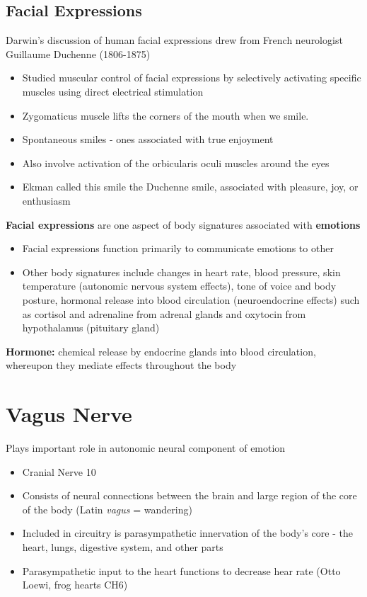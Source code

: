 \documentclass{article}
\begin{document}
\subsection{Facial Expressions}
Darwin's discussion of human facial expressions drew from French neurologist Guillaume Duchenne (1806-1875)
\begin{itemize}
    \item Studied muscular control of facial expressions by selectively activating specific muscles using direct electrical stimulation
    \item Zygomaticus muscle lifts the corners of the mouth when we smile. 
    \item Spontaneous smiles - ones associated with true enjoyment
    \item Also involve activation of the orbicularis oculi muscles around the eyes
    \item Ekman called this smile the Duchenne smile, associated with pleasure, joy, or enthusiasm
\end{itemize}

\noindent \textbf{Facial expressions} are one aspect of body signatures associated with \textbf{emotions}
\begin{itemize}
    \item Facial expressions function primarily to communicate emotions to other
    \item Other body signatures include changes in heart rate, blood pressure, skin temperature (autonomic nervous system effects), tone of voice and body posture, hormonal release into blood circulation (neuroendocrine effects) such as cortisol and adrenaline from adrenal glands and oxytocin from hypothalamus (pituitary gland) 
\end{itemize}

\noindent \textbf{Hormone:} chemical release by endocrine glands into blood circulation, whereupon they mediate effects throughout the body 

\newpage
\section{Vagus Nerve}
Plays important role in autonomic neural component of emotion 
\begin{itemize}
    \item Cranial Nerve 10 
    \item Consists of neural connections between the brain and large region of  the core of the body (Latin \textit{vagus} = wandering) 
    \item Included in circuitry is parasympathetic innervation of the body's core - the heart, lungs, digestive system, and other parts
    \item Parasympathetic input to the heart functions to decrease hear rate (Otto Loewi, frog hearts CH6) 
\end{itemize}
\end{document}
